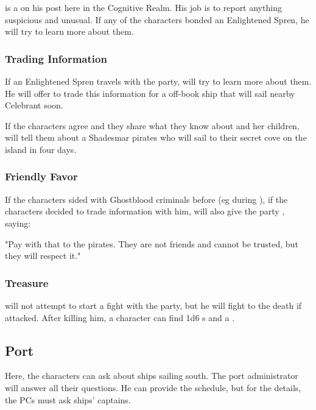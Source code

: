 \npcGhostbloodScout[s]{} is a \enemyGhostbloodScout{} on his post here in the Cognitive Realm. His job is to report anything suspicious and unusual. If any of the characters bonded an Enlightened Spren, he will try to learn more about them.

\subsubsection{Trading Information}

If an Enlightened Spren travels with the party, \npcGhostbloodScout{} will try to learn more about them. He will offer to trade this information for a off-book ship that will sail nearby Celebrant soon.

If the characters agree and they share what they know about \npcSjaAnat{} and her children, \npcGhostbloodScout{} will tell them about a Shadesmar pirates who will sail to their secret cove on the island in four days. 

\subsubsection{Friendly Favor}

If the characters sided with Ghostblood criminals before (eg during ), if the characters decided to trade information with him, \npcGhostbloodScout{} will also give the party \lootScadrialCoin{}, saying: 

"Pay with that to the pirates. They are not friends and cannot be trusted, but they will respect it."

\subsubsection{Treasure}

\enemyGhostbloodScout{} will not attempt to start a fight with the party, but he will fight to the death if attacked. After killing him, a character can find 1d6 \lootScadrialCoin{}s and a \lootSeonTube{}.



\subsection{Port}

Here, the characters can ask about ships sailing south. The port administrator will answer all their questions. He can provide the schedule, but for the details, the PCs must ask ships' captains.


